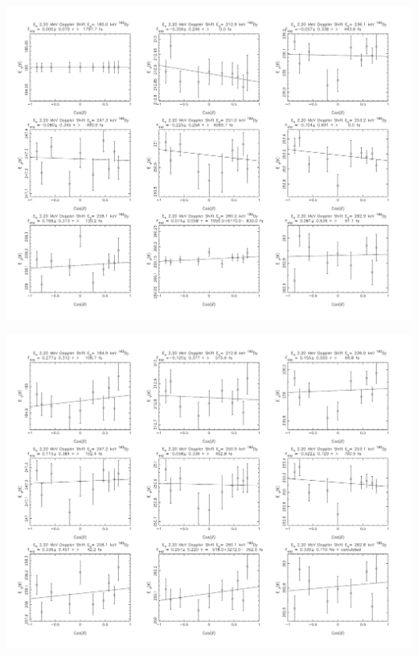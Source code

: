 \begin{center}
\includegraphics[page=11,angle=90,height=0.95\textheight]{162Dy_ftau_220_LE_n.pdf}
\end{center}
\begin{center}
\includegraphics[page=12,angle=90,height=0.95\textheight]{162Dy_ftau_220_HE_n.pdf}
\end{center}
